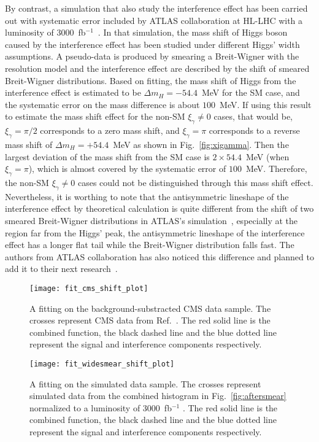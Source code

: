 \documentclass[twocolumn,
prd,amssymb,amsmath,preprintnumbers,
floatfix,aps,nofootinbib]{revtex4-1}
\begin{document}
By contrast,
a simulation that also study the interference effect has been carried out
with systematic error included
by ATLAS collaboration at HL-LHC with a luminosity of 3000~fb$^{-1}$~\cite{ATL-PHYS-PUB-2013-014}.
In that simulation, the mass shift of Higgs boson caused by the interference effect
has been studied under different Higgs' width assumptions.
A pseudo-data is produced by smearing a Breit-Wigner with the resolution model
and the interference effect are described by the shift of smeared Breit-Wigner distributions.
Based on fitting, the mass shift of Higgs from the interference effect is estimated to be $\Delta m_H=-54.4$~MeV for the SM case,
and the systematic error on the mass difference is about $100$~MeV.
If using this result to estimate the mass shift effect for the non-SM $\xi_\gamma\ne 0$ cases, that would be,
$\xi_\gamma=\pi/2$ corresponds to a zero mass shift,
and $\xi_\gamma=\pi$ corresponds to a reverse mass shift of $\Delta m_H=+54.4$~MeV as shown in Fig.~\ref{fig:xigamma}.
Then the largest deviation of the mass shift from the SM case is $2\times 54.4$~MeV (when $\xi_\gamma=\pi$), which is almost covered by the systematic error of $100$~MeV.
Therefore, the non-SM $\xi_\gamma\ne 0$ cases could not be distinguished
 through this mass shift
effect.
Nevertheless, it is worthing to note that the antisymmetric lineshape of the interference
effect by theoretical calculation is quite different from the shift of two smeared Breit-Wigner distributions in ATLAS's simulation~\cite{ATL-PHYS-PUB-2013-014},
especially at the region far from the Higgs' peak, the antisymmetric lineshape of the interference
effect has a longer
 flat tail while the Breit-Wigner distribution falls fast.
The authors from ATLAS collaboration has also noticed this difference and planned to
add it to their next research~\cite{ATL-PHYS-PUB-2013-014}.


\begin{figure}[htbp]
\begin{center}
\texttt{[image: fit\_cms\_shift\_plot]}
\end{center}
\caption{A fitting on the background-substracted CMS data sample.
The crosses represent CMS data from Ref.~\cite{CMS:2017rli}.
The red solid line is the combined function, the black dashed line and the blue dotted line represent the signal and interference components respectively.
}
\label{fig:cms}
\end{figure}


\begin{figure}[htbp]
\begin{center}
\texttt{[image: fit\_widesmear\_shift\_plot]}
\end{center}
\caption{
A fitting on the simulated data sample.
The crosses represent simulated data from the combined histogram in Fig.~\ref{fig:aftersmear} normalized to a luminosity of 3000~fb$^{-1}$ .
The red solid line is the combined function, the black dashed line and the blue dotted line represent the signal and interference components respectively.
  }
\label{fig:pseudo}
\end{figure}
\end{document}
